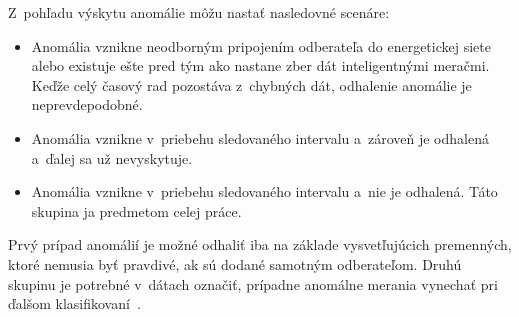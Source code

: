 \documentclass[a4paper,twoside,slovak,12pt,appendix]{article}
\begin{document}
Z~pohľadu výskytu anomálie môžu nastať nasledovné scenáre:
\begin{itemize}
  \item Anomália vznikne neodborným pripojením odberateľa do energetickej siete alebo existuje ešte pred tým ako nastane zber dát inteligentnými meračmi.
        Keďže celý časový rad pozostáva z~chybných dát, odhalenie anomálie je neprevdepodobné.
  \item Anomália vznikne v~priebehu sledovaného intervalu a~zároveň je odhalená a~ďalej sa už nevyskytuje.
  \item Anomália vznikne v~priebehu sledovaného intervalu a~nie je odhalená. Táto skupina ja predmetom celej práce.
\end{itemize}
Prvý prípad anomálií je možné odhaliť iba na základe vysvetľujúcich premenných,
ktoré nemusia byť pravdivé, ak sú dodané samotným odberateľom. Druhú skupinu je
potrebné v~dátach označiť, prípadne anomálne merania vynechať pri ďalšom
klasifikovaní~\cite{Spiric2015}.


\end{document}
